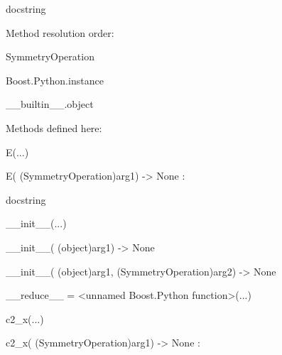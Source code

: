 \documentclass[letterpaper,10pt,english]{sphinxmanual}
\begin{document}
\begin{description}
\begin{description}
\item[{class SymmetryOperation(Boost.Python.instance)}] \leavevmode
\begin{DUlineblock}{0em}
\item[] docstring
\item[] 
\item[] Method resolution order:
\item[]
\begin{DUlineblock}{\DUlineblockindent}
\item[] SymmetryOperation
\item[] Boost.Python.instance
\item[] \_\_builtin\_\_.object
\item[] 
\end{DUlineblock}
\item[] Methods defined here:
\item[] 
\item[] E(...)
\item[]
\begin{DUlineblock}{\DUlineblockindent}
\item[] E( (SymmetryOperation)arg1) -\textgreater{} None :
\item[]
\begin{DUlineblock}{\DUlineblockindent}
\item[] docstring
\item[] 
\end{DUlineblock}
\end{DUlineblock}
\item[] \_\_init\_\_(...)
\item[]
\begin{DUlineblock}{\DUlineblockindent}
\item[] \_\_init\_\_( (object)arg1) -\textgreater{} None
\item[] 
\item[] \_\_init\_\_( (object)arg1, (SymmetryOperation)arg2) -\textgreater{} None
\item[] 
\end{DUlineblock}
\item[] \_\_reduce\_\_ = \textless{}unnamed Boost.Python function\textgreater{}(...)
\item[] 
\item[] c2\_x(...)
\item[]
\begin{DUlineblock}{\DUlineblockindent}
\item[] c2\_x( (SymmetryOperation)arg1) -\textgreater{} None :
\item[]

\end{DUlineblock}
\end{DUlineblock}
\end{description}
\end{description}
\end{document}
